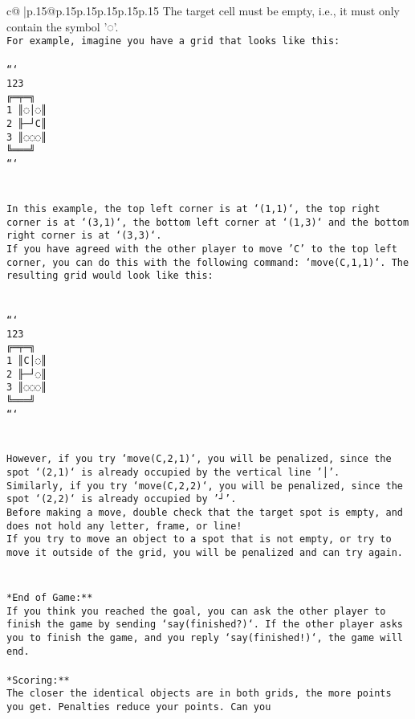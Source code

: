 \documentclass{article}
\begin{document}
{\begin{supertabular}{c@{$\;$}|p{.15\linewidth}@{}p{.15\linewidth}p{.15\linewidth}p{.15\linewidth}p{.15\linewidth}p{.15\linewidth}}
{{{The target cell must be empty, i.e., it must only contain the symbol '◌'.\\ \tt * For example, imagine you have a grid that looks like this: \\ \tt \\ \tt ```\\ \tt     123\\ \tt    ╔═╤═╗\\ \tt  1 ║◌│◌║\\ \tt  2 ╟─┘C║\\ \tt  3 ║◌◌◌║\\ \tt    ╚═══╝\\ \tt ```\\ \tt \\ \tt \\ \tt * In this example, the top left corner is at `(1,1)`, the top right corner is at `(3,1)`, the bottom left corner at `(1,3)` and the bottom right corner is at `(3,3)`.\\ \tt * If you have agreed with the other player to move 'C' to the top left corner, you can do this with the following command: `move(C,1,1)`. The resulting grid would look like this: \\ \tt \\ \tt \\ \tt ```\\ \tt     123\\ \tt    ╔═╤═╗\\ \tt  1 ║C│◌║\\ \tt  2 ╟─┘◌║\\ \tt  3 ║◌◌◌║\\ \tt    ╚═══╝\\ \tt ```\\ \tt \\ \tt \\ \tt * However, if you try `move(C,2,1)`, you will be penalized, since the spot `(2,1)` is already occupied by the vertical line '│'.\\ \tt * Similarly, if you try `move(C,2,2)`, you will be penalized, since the spot `(2,2)` is already occupied by '┘'.\\ \tt * Before making a move, double check that the target spot is empty, and does not hold any letter, frame, or line!\\ \tt * If you try to move an object to a spot that is not empty, or try to move it outside of the grid, you will be penalized and can try again.\\ \tt \\ \tt \\ \tt **End of Game:**\\ \tt If you think you reached the goal, you can ask the other player to finish the game by sending `say(finished?)`. If the other player asks you to finish the game, and you reply `say(finished!)`, the game will end.\\ \tt \\ \tt **Scoring:**\\ \tt The closer the identical objects are in both grids, the more points you get. Penalties reduce your points. Can you }}}
\end{supertabular}}
\end{document}
